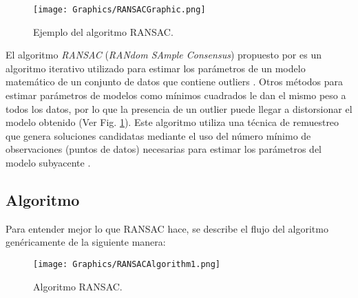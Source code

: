 \begin{figure}[b]
    \centering
    \texttt{[image: Graphics/RANSACGraphic.png]}
    \caption{Ejemplo del algoritmo RANSAC.}
    \label{fig:RANSACExample}
\end{figure}

El algoritmo \textit{RANSAC} (\textit{RANdom SAmple Consensus}) propuesto por \cite{FischlerBolles} es un algoritmo iterativo utilizado para estimar los parámetros de un modelo matemático de un conjunto de datos que contiene outliers \cite{PabloJuan}. Otros métodos para estimar parámetros de modelos como mínimos cuadrados le dan el mismo peso a todos los datos, por lo que la presencia de un outlier puede llegar a distorsionar el modelo obtenido (Ver Fig. \ref{fig:RANSACExample}). Este algoritmo utiliza una técnica de remuestreo que genera soluciones candidatas mediante el uso del número mínimo de observaciones (puntos de datos) necesarias para estimar los parámetros del modelo subyacente \cite{Konstantinos}.

\subsection{Algoritmo}

Para entender mejor lo que RANSAC hace, se describe el flujo del algoritmo genéricamente de la siguiente manera:

\begin{figure}[!h]
	\centering
	\texttt{[image: Graphics/RANSACAlgorithm1.png]}
	\caption{Algoritmo RANSAC.}
	\label{fig:RANSACAlgorithm}
\end{figure}

